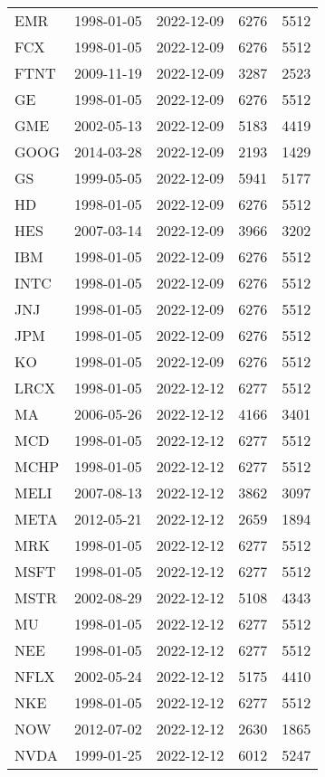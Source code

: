\begin{table}[ht]
\begin{tabular}{lllrr}
  EMR & 1998-01-05 & 2022-12-09 & 6276 & 5512 \\ 
  FCX & 1998-01-05 & 2022-12-09 & 6276 & 5512 \\ 
  FTNT & 2009-11-19 & 2022-12-09 & 3287 & 2523 \\ 
  GE & 1998-01-05 & 2022-12-09 & 6276 & 5512 \\ 
  GME & 2002-05-13 & 2022-12-09 & 5183 & 4419 \\ 
  GOOG & 2014-03-28 & 2022-12-09 & 2193 & 1429 \\ 
  GS & 1999-05-05 & 2022-12-09 & 5941 & 5177 \\ 
  HD & 1998-01-05 & 2022-12-09 & 6276 & 5512 \\ 
  HES & 2007-03-14 & 2022-12-09 & 3966 & 3202 \\ 
  IBM & 1998-01-05 & 2022-12-09 & 6276 & 5512 \\ 
  INTC & 1998-01-05 & 2022-12-09 & 6276 & 5512 \\ 
  JNJ & 1998-01-05 & 2022-12-09 & 6276 & 5512 \\ 
  JPM & 1998-01-05 & 2022-12-09 & 6276 & 5512 \\ 
  KO & 1998-01-05 & 2022-12-09 & 6276 & 5512 \\ 
  LRCX & 1998-01-05 & 2022-12-12 & 6277 & 5512 \\ 
  MA & 2006-05-26 & 2022-12-12 & 4166 & 3401 \\ 
  MCD & 1998-01-05 & 2022-12-12 & 6277 & 5512 \\ 
  MCHP & 1998-01-05 & 2022-12-12 & 6277 & 5512 \\ 
  MELI & 2007-08-13 & 2022-12-12 & 3862 & 3097 \\ 
  META & 2012-05-21 & 2022-12-12 & 2659 & 1894 \\ 
  MRK & 1998-01-05 & 2022-12-12 & 6277 & 5512 \\ 
  MSFT & 1998-01-05 & 2022-12-12 & 6277 & 5512 \\ 
  MSTR & 2002-08-29 & 2022-12-12 & 5108 & 4343 \\ 
  MU & 1998-01-05 & 2022-12-12 & 6277 & 5512 \\ 
  NEE & 1998-01-05 & 2022-12-12 & 6277 & 5512 \\ 
  NFLX & 2002-05-24 & 2022-12-12 & 5175 & 4410 \\ 
  NKE & 1998-01-05 & 2022-12-12 & 6277 & 5512 \\ 
  NOW & 2012-07-02 & 2022-12-12 & 2630 & 1865 \\ 
  NVDA & 1999-01-25 & 2022-12-12 & 6012 & 5247 \\ 

\end{tabular}
\end{table}
